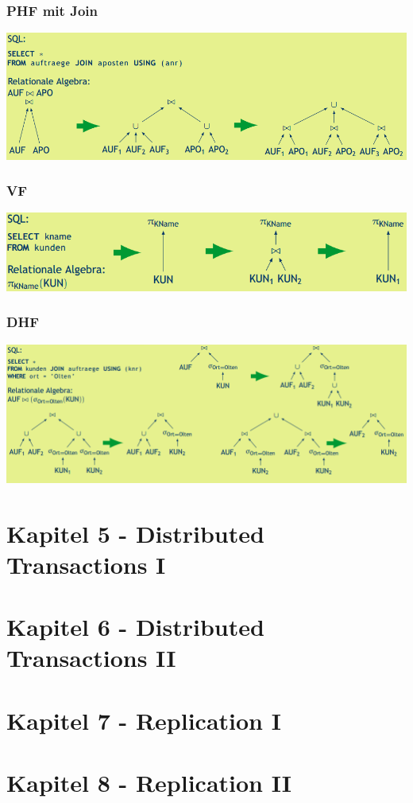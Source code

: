\documentclass[a4paper,11pt]{article}
\begin{document}
\subsubsection{PHF mit Join}
\includegraphics[scale=0.7]{src/phf_join.png}
\subsubsection{VF}
\includegraphics[scale=0.7]{src/vf.png}
\subsubsection{DHF}
\includegraphics[scale=0.65]{src/dhf_red.png}
\section{Kapitel 5 - Distributed Transactions I}
\section{Kapitel 6 - Distributed Transactions II}
\section{Kapitel 7 - Replication I}
\section{Kapitel 8 - Replication II}
\end{document}
